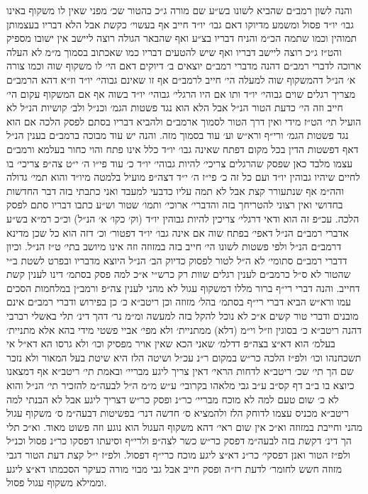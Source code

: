 \documentclass[12pt, openany]{book}
\begin{document}
\begin{multicols}{2}
והנה לשון רמב״ם שהביא לשונו בש״ע שם מורה ג״כ כהטור שכ׳ מפני שאין לו משקוף באינו גבו׳ יו״ד פסול ומשמע מדיוקו דאם גבו׳ יו״ד חייב אף בעשוי׳ כקשת אבל הלא דבריו בעצמותן תמוהין וכמו שתמה הכ״מ והניח דבריו בצ״ע ואף שהבאר הגולה רוצה ליישב אין ישובו מספיק והט״ז ג״כ רוצה ליישב דבריו ואף שיש להטעים דבריו כמו שאכתוב בסמוך מ״מ לא העלה ארוכה לדברי רמב״ם דהנה מדברי רמב״ם יוצאים ב׳ דיוקים דאם הי׳ לו משקוף שוה וכמו צורה א׳ הנ״ל דהמשקוף שוה למעלה הי׳ חייב לרמב״ם אף זו שאינם גבוהי׳ יו״ד וז״א דהא הרמב״ם מצריך רגלים שוים גבוהי׳ יו״ד ותו אם היו הרגלי׳ גבוהי׳ יו״ד בשוה אף אם המשקוף עקום הי׳ חייב וזה הי׳ כדעת הטור הנ״ל אבל הלא הוא נגד פשטות הגמ׳ וכנ״ל ולב׳ קושיות הנ״ל לא הועיל תי׳ הט״ז מידי ואין דרך הטור לסמוך ארמב״ם ולהביא דבריו בסתם לפסק הלכה אם הוא נגד פשטות הגמ׳ ורי״ף ורא״ש וע׳ עוד בסמוך מזה. והנה יש עוד מבוכה ברמב״ם בענין הנ״ל דאף דפשטות הדין בכל מקום דפתח שאינה גבו׳ יו״ד כלל אינו פתח והוי כחור בעלמא ורמב״ם עצמו מלבד כאן שפסק שהרגלים צריכי׳ להיות גבוהי׳ יו״ד כ׳ עוד פי״ו ה׳ י״ט צה״פ צריכי׳ בו לחיים שיהיו גבוהין יו״ד ועם כל זה כ׳ פי״ז ה׳ י״ד דצה״פ מועיל בלמטה מיו״ד והוא תמי׳ גדולה והה״מ אף שנתעורר קצת אבל לא תמה עליו כדבעי למעבד ואני כתבתי בזה דבר החדשות בחדושי ואין רצוני להטריחך בזה והדברי׳ ארוכי׳ ותמו׳ שטור וש״ע כתבו דבריו סתם לפסק הלכה. עכ״פ זה הוא ודאי דרגלי׳ צריכין להיות גבוהין יו״ד (וק׳ כקו׳ א׳ הנ״ל) וכ״כ רמ״א בש״ע אדברי רמב״ם הנ״ל דאפי׳ בפתח שוה אם אינה גבו׳ יו״ד דפטור׳ וכ׳ דזה הוא כל שכן מדינא דרמב״ם הנ״ל ולפי פשטות לשונו הי׳ חייב בזה במזוזה וזה אינו מיושב בתי׳ ט״ז הנ״ל. וכיון דדברי רמב״ם סתומי׳ לא ה״ל לטור לפסוק כדיוק הב׳ הנ״ל היוצא מדבריו ובפרט לשטת ב״י שהטור לא ס״ל כרמב״ם לענין רגלים שוות רק כרש״י א״כ למה פסק בסתמ׳ דינו לענין קשת דחייב. והנה דברי רי״ף ברור מללו דמשקוף עגול לא מהני לענין צה״פ ורמב״ן במלחמות הסכים עמו ורא״ש הביא דברי רי״ף בסתמ׳ בהל׳ מזוזה וכן ריטב״א כ׳ כן בפירוש ודברי רמב״ם אינם מובנים ודברי טור קשים א״כ לא נוכל להקל בזה למעשה ומ״מ נר׳ דהך דינ׳ תלי באשלי רברבי דהנה ריטב״א כ׳ בסוגין וז״ל וי״מ (דלא) ממתניית׳ ולא מפי׳ אביי פשטי מידי בהא אלא מתניית׳ בעלמ׳ הוא דא״צ בצה״פ דדלמ׳ שאני הכא שאין אויר מפסיק וכו׳ ולא גרסו הא דא״ל אי תשכחנהו וכו׳ ולפ״ז הלכה כר״ש במקום ר״נ עכ״ל ושיטה הלז היא שיטת בעל המאור ולא נזכר שם הך תי׳ שכ׳ ריטב״א לדחות הראי׳ דאין צריך ליגע מבריי׳ ובאמת תי׳ ריטב״א אף דמצאנו כיוצא בו ב״ב דף קס״ב ע״ב גבי מלאהו בקרובי׳ ע״ש מ״מ ה״ל לבעה״מ להזכיר תי׳ הנ״ל והוא לא כ׳ שום טעם למה לא מוכח מבריי׳ כר״נ ופסק כר״ש דצריך ליגע אבל לא הבנתי למה ריטב״א מכניס עצמו לדוחק הלז ולהמציא ס׳ חדשה דנר׳ בפשיטות דבעה״מ ס׳ משקוף עגול מהני וחייבת במזוזה וא״כ אין שום ראי׳ דהא משקוף העגול הוא נוגע וזה פשוט מאוד. וא״כ תלי הך דינ׳ דקשת בזה לבעה״מ דפסק כר״ש כשר לצה״פ ולרי״ף וסיעתו דפסקו כר״נ פסול וכנ״ל ולפ״ז הטור ואנן דפסקי׳ כר״נ דא״צ ליגע מוכח כרי״ף דפסול. ולפ״ז י״ל קצת דעת הטור דגבי מזוזה חשש לחומר׳ לדעת רז״ה ופסק חייב אבל גבי מבוי מורה כעיקר הסכמתו דא״צ ליגע וממילא משקוף עגול פסול.\\\vspace{0pt}


\end{multicols}
\end{document}
